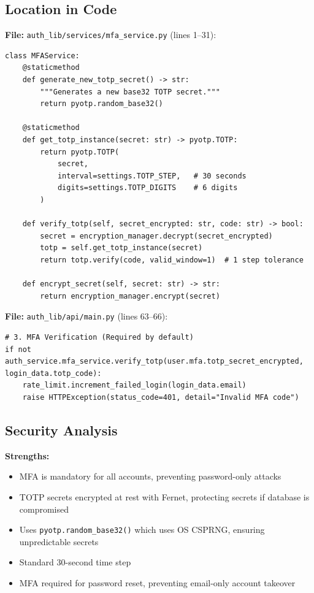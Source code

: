 \documentclass[11pt,a4paper]{article}
\begin{document}
\subsection{Location in Code}

\textbf{File:} \texttt{auth\_lib/services/mfa\_service.py} (lines 1--31):
\begin{lstlisting}
class MFAService:
    @staticmethod
    def generate_new_totp_secret() -> str:
        """Generates a new base32 TOTP secret."""
        return pyotp.random_base32()

    @staticmethod
    def get_totp_instance(secret: str) -> pyotp.TOTP:
        return pyotp.TOTP(
            secret, 
            interval=settings.TOTP_STEP,   # 30 seconds
            digits=settings.TOTP_DIGITS    # 6 digits
        )

    def verify_totp(self, secret_encrypted: str, code: str) -> bool:
        secret = encryption_manager.decrypt(secret_encrypted)
        totp = self.get_totp_instance(secret)
        return totp.verify(code, valid_window=1)  # 1 step tolerance

    def encrypt_secret(self, secret: str) -> str:
        return encryption_manager.encrypt(secret)
\end{lstlisting}

\textbf{File:} \texttt{auth\_lib/api/main.py} (lines 63--66):
\begin{lstlisting}
# 3. MFA Verification (Required by default)
if not auth_service.mfa_service.verify_totp(user.mfa.totp_secret_encrypted, login_data.totp_code):
    rate_limit.increment_failed_login(login_data.email)
    raise HTTPException(status_code=401, detail="Invalid MFA code")
\end{lstlisting}

\subsection{Security Analysis}

\textbf{Strengths:}
\begin{itemize}[noitemsep]
    \item MFA is mandatory for all accounts, preventing password-only attacks
    \item TOTP secrets encrypted at rest with Fernet, protecting secrets if database is compromised
    \item Uses \texttt{pyotp.random\_base32()} which uses OS CSPRNG, ensuring unpredictable secrets
    \item Standard 30-second time step
    \item MFA required for password reset, preventing email-only account takeover
\end{itemize}
\end{document}
